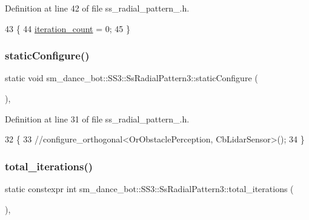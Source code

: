 Definition at line 42 of file ss\+\_\+radial\+\_\+pattern\+\_.\+h.


\begin{DoxyCode}
43     \{
44         \hyperlink{structsm__dance__bot_1_1SS3_1_1SsRadialPattern3_a62885be83defcafb3fe5237dd3ec6b4c}{iteration\_count} = 0;
45     \}
\end{DoxyCode}
\mbox{\label{structsm__dance__bot_1_1SS3_1_1SsRadialPattern3_a79e74e3a784e82a36677b8f36a3041fe}} 
\subsubsection{\texorpdfstring{static\+Configure()}{staticConfigure()}}
{\footnotesize\ttfamily static void sm\+\_\+dance\+\_\+bot\+::\+S\+S3\+::\+Ss\+Radial\+Pattern3\+::static\+Configure (\begin{DoxyParamCaption}{ }\end{DoxyParamCaption})\hspace{0.3cm}{\ttfamily [inline]}, {\ttfamily [static]}}



Definition at line 31 of file ss\+\_\+radial\+\_\+pattern\+\_.\+h.


\begin{DoxyCode}
32     \{
33         \textcolor{comment}{//configure\_orthogonal<OrObstaclePerception, CbLidarSensor>();}
34     \}
\end{DoxyCode}
\mbox{\label{structsm__dance__bot_1_1SS3_1_1SsRadialPattern3_a131ebb64f66358e769217388cb2b05c5}} 
\subsubsection{\texorpdfstring{total\+\_\+iterations()}{total\_iterations()}}
{\footnotesize\ttfamily static constexpr int sm\+\_\+dance\+\_\+bot\+::\+S\+S3\+::\+Ss\+Radial\+Pattern3\+::total\+\_\+iterations (\begin{DoxyParamCaption}{ }\end{DoxyParamCaption})\hspace{0.3cm}{\ttfamily [inline]}, {\ttfamily [static]}}



